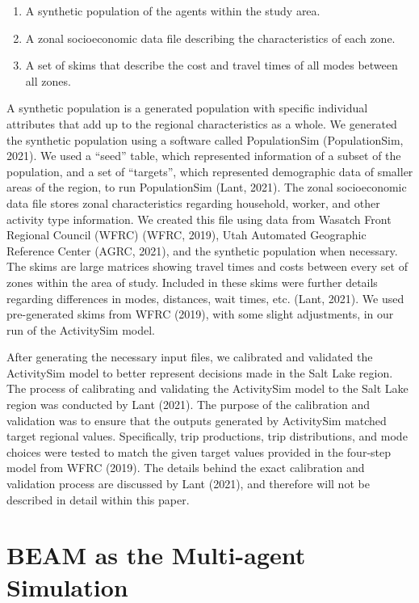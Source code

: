 \documentclass[fancy, masters]{byuthesis}
\providecommand{\tightlist}{%
  \setlength{\itemsep}{0pt}\setlength{\parskip}{0pt}}
\begin{document}
\begin{enumerate}
\def\labelenumi{\arabic{enumi}.}
\tightlist
\item
  A synthetic population of the agents within the study area.
\item
  A zonal socioeconomic data file describing the characteristics of each zone.
\item
  A set of skims that describe the cost and travel times of all modes between all zones.
\end{enumerate}

A synthetic population is a generated population with specific individual attributes that add up to the regional characteristics as a whole. We generated the synthetic population using a software called PopulationSim (PopulationSim, 2021). We used a ``seed'' table, which represented information of a subset of the population, and a set of ``targets'', which represented demographic data of smaller areas of the region, to run PopulationSim (Lant, 2021). The zonal socioeconomic data file stores zonal characteristics regarding household, worker, and other activity type information. We created this file using data from Wasatch Front Regional Council (WFRC) (WFRC, 2019), Utah Automated Geographic Reference Center (AGRC, 2021), and the synthetic population when necessary. The skims are large matrices showing travel times and costs between every set of zones within the area of study. Included in these skims were further details regarding differences in modes, distances, wait times, etc. (Lant, 2021). We used pre-generated skims from WFRC (2019), with some slight adjustments, in our run of the ActivitySim model.

After generating the necessary input files, we calibrated and validated the ActivitySim model to better represent decisions made in the Salt Lake region. The process of calibrating and validating the ActivitySim model to the Salt Lake region was conducted by Lant (2021). The purpose of the calibration and validation was to ensure that the outputs generated by ActivitySim matched target regional values. Specifically, trip productions, trip distributions, and mode choices were tested to match the given target values provided in the four-step model from WFRC (2019). The details behind the exact calibration and validation process are discussed by Lant (2021), and therefore will not be described in detail within this paper.

\hypertarget{meth-beam}{%
\section{BEAM as the Multi-agent Simulation}\label{meth-beam}}
\end{document}
